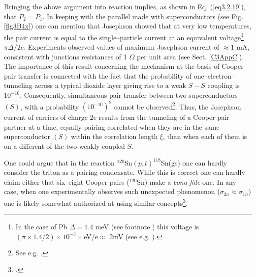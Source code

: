 \begin{subappendices}
 
Bringing the above argument into reaction implies, as shown in Eq. (\ref{eq3.2.19}), that $P_2=P_1$.
In keeping with the parallel made with superconductors (see Fig. \ref{fig3B4x}) one can mention that Josephson showed that at very low temperatures, the pair current is equal to the single--particle current at an equivalent voltage\footnote{In the case of Pb $\Delta=1.4$ meV (see footnote \footnotemark[\ref{foot75}]) this voltage is $(\pi\times1.4/2)\times 10^{-3}\times$eV/e$\approx$ 2mV (see e.g. \cite{McDonald:01}).} $\pi\Delta/2e$. Experiments observed values of maximum Josephson current of $\approx1$ mA, consistent with junctions resistances of 1 $\Omega$ per unit area (see Sect. \ref{C3AppC}). The importance of this result  concerning the mechanism at the basis of Cooper pair transfer is connected with the fact that the probability of one--electron--tunneling across a typical dioxide layer giving rise to a weak $S-S$ coupling is $10^{-10}$. Consequently, simultaneous pair transfer between two superconductors $(S)$, with a probability  $(10^{-10})^2$ cannot be observed\footnote{See e.g. \cite{McDonald:01}.}. Thus, the Josephson current of carriers of charge $2e$ results from the tunneling of a Cooper pair partner at a time, equally pairing correlated when they are in the same superconductor $(S)$ within the correlation length $\xi$, than when each of them is on a different of the two weakly coupled $S$. 


One could argue that in the reaction $^{120}$Sn$(p,t)^{118}$Sn(gs) one can hardly consider the triton as a pairing condensate. While this is correct one can hardly claim either that six--eight Cooper pairs ($^{120}$Sn) make a \textit{bona fide} one. In any case, when one experimentally observes such unexpected phenomenon ($\sigma_{2n}\approx\sigma_{1n}$) one is likely somewhat authorized at using similar concepts\footnote{\cite{Anderson:72}.}.

\end{subappendices}
